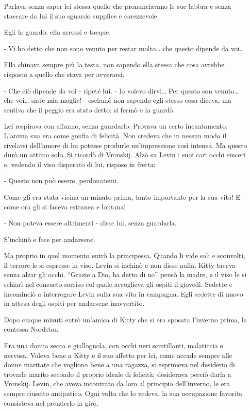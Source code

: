 Parlava senza saper lei stessa quello che pronunciavano le sue labbra e senza staccare da lui il suo sguardo supplice e carezzevole. 

Egli la guardò; ella arrossì e tacque. 

- Vi ho detto che non sono venuto per restar molto\ldots{} che questo dipende da voi\ldots{} 

Ella chinava sempre più la testa, non sapendo ella stessa che cosa avrebbe risposto a quello che stava per avverarsi. 

- Che ciò dipende da voi - ripeté lui. - Io volevo dirvi\ldots{} Per questo son venuto\ldots{} che voi\ldots{} siate mia moglie! - esclamò non sapendo egli stesso cosa diceva, ma sentiva che il peggio era stato detto; si fermò e la guardò. 

Lei respirava con affanno, senza guardarlo. Provava un certo incantamento. L'anima sua era come gonfia di felicità. Non credeva che in nessun modo il rivelarsi dell'amore di lui potesse produrle un'impressione così intensa. Ma questo durò un attimo solo. Si ricordò di Vronskij. Alzò su Levin i suoi cari occhi sinceri e, vedendo il viso disperato di lui, rispose in fretta: 

- Questo non può essere, perdonatemi. 

Come gli era stata vicina un minuto prima, tanto importante per la sua vita! E come ora gli si faceva estranea e lontana! 

- Non poteva essere altrimenti - disse lui, senza guardarla. 

S'inchinò e fece per andarsene. 

\label{xiv} 

Ma proprio in quel momento entrò la principessa. Quando li vide soli e sconvolti, il terrore le si espresse in viso. Levin si inchinò e non disse nulla. Kitty taceva senza alzar gli occhi. ``Grazie a Dio, ha detto di no'' pensò la madre, e il viso le si schiarì nel consueto sorriso col quale accoglieva gli ospiti il giovedì. Sedette e incominciò a interrogare Levin sulla sua vita in campagna. Egli sedette di nuovo in attesa degli ospiti per andarsene inavvertito. 

Dopo cinque minuti entrò un'amica di Kitty che si era sposata l'inverno prima, la contessa Nordston. 

Era una donna secca e giallognola, con occhi neri scintillanti, malaticcia e nervosa. Voleva bene a Kitty e il suo affetto per lei, come accade sempre alle donne maritate che vogliono bene a una ragazza, si esprimeva nel desiderio di trovarle marito secondo il proprio ideale di felicità; desiderava perciò darla a Vronskij. Levin, che aveva incontrato da loro al principio dell'inverno, le era sempre riuscito antipatico. Ogni volta che lo vedeva, la sua occupazione favorita consisteva nel prenderlo in giro. 

